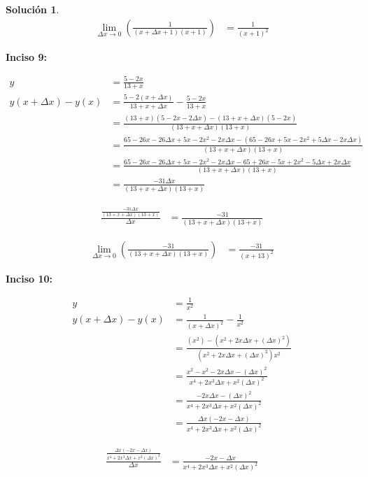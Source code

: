 \documentclass{article}
\theoremstyle{definition}
\newtheorem*{solution}{Solución}
\begin{document}
\begin{solution}
    \begin{align*}
        \lim_{\Delta x \to 0} (\frac{1}{(x+\Delta x+1)(x+1)} ) &= \frac{1}{(x+1)^2}
    \end{align*}  

\textbf{Inciso 9:}

    \begin{align*}
        y &= \frac{5-2x}{13+x} \\
        y(x+\Delta x) - y(x) &= \frac{5-2(x+\Delta x)}{13+x+\Delta x}-\frac{5-2x}{13+x} \\
        &= \frac{(13+x)(5-2x-2\Delta x)-(13+x+\Delta x)(5-2x)}{(13+x+\Delta x)(13+x)} \\
        &= \frac{65-26x-26\Delta x+5x-2x^2-2x\Delta x-(65-26x+5x-2x^2+5\Delta x-2x\Delta x)}{(13+x+\Delta x)(13+x)} \\
        &= \frac{65-26x-26\Delta x+5x-2x^2-2x\Delta x-65+26x-5x+2x^2-5\Delta x+2x\Delta x}{(13+x+\Delta x)(13+x)} \\
        &= \frac{-31\Delta x}{(13+x+\Delta x)(13+x)} 
    \end{align*}

    \begin{align*}
        \frac{\frac{-31\Delta x}{(13+x+\Delta x)(13+x)}}{\Delta x} &= \frac{-31}{(13+x+\Delta x)(13+x)}    
    \end{align*}

    \begin{align*}
        \lim_{\Delta x \to 0} (\frac{-31}{(13+x+\Delta x)(13+x)}) &= \frac{-31}{(x+13)^2}
    \end{align*}  

\textbf{Inciso 10:}

    \begin{align*}
        y &= \frac{1}{x^2} \\
        y(x+\Delta x) - y(x) &= \frac{1}{(x+\Delta x)^2}-\frac{1}{x^2} \\
        &= \frac{(x^2)-(x^2+2x\Delta x+(\Delta x)^2)}{(x^2+2x\Delta x+(\Delta x)^2)x^2} \\
        &= \frac{x^2-x^2-2x\Delta x-(\Delta x)^2}{x^4+2x^3\Delta x+x^2(\Delta x)^2} \\
        &= \frac{-2x\Delta x-(\Delta x)^2}{x^4+2x^3\Delta x+x^2(\Delta x)^2} \\
        &= \frac{\Delta x(-2x-\Delta x)}{x^4+2x^3\Delta x+x^2(\Delta x)^2}
    \end{align*}

    \begin{align*}
        \frac{\frac{\Delta x(-2x-\Delta x)}{x^4+2x^3\Delta x+x^2(\Delta x)^2}}{\Delta x} &= \frac{-2x-\Delta x}{x^4+2x^3\Delta x+x^2(\Delta x)^2}    
    \end{align*}


\end{solution}
\end{document}
